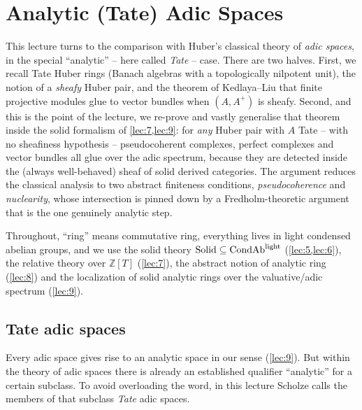 \section{Analytic (Tate) Adic Spaces}
\label{lec:10}

This lecture turns to the comparison with Huber's
classical theory of \emph{adic spaces}, in the special ``analytic'' -- here
called \emph{Tate} -- case. There are two halves. First, we recall Tate Huber
rings (Banach algebras with a topologically nilpotent unit), the notion of a
\emph{sheafy} Huber pair, and the theorem of Kedlaya--Liu that finite projective
modules glue to vector bundles when $(A,A^{+})$ is sheafy. Second, and this is
the point of the lecture, we re-prove and vastly generalise that theorem inside
the solid formalism of \cref{lec:7,lec:9}: for \emph{any} Huber pair with $A$
Tate -- with no sheafiness hypothesis -- pseudocoherent complexes, perfect
complexes and vector bundles all glue over the adic spectrum, because they are
detected inside the (always well-behaved) sheaf of solid derived categories. The
argument reduces the classical analysis to two abstract finiteness conditions,
\emph{pseudocoherence} and \emph{nuclearity}, whose intersection is pinned down
by a Fredholm-theoretic argument that is the one genuinely analytic step.

Throughout, ``ring'' means commutative ring, everything lives in light condensed
abelian groups, and we use the solid theory $\mathrm{Solid}\subseteq\mathrm{CondAb}^{\mathrm{light}}$
(\cref{lec:5,lec:6}), the relative theory over $\mathbb{Z}[T]$ (\cref{lec:7}),
the abstract notion of analytic ring (\cref{lec:8}) and the localization of
solid analytic rings over the valuative/adic spectrum (\cref{lec:9}).

\subsection{Tate adic spaces}

\begin{remark}
\label{rmk:10:terminology}
Every adic space gives rise to an analytic space in our sense (\cref{lec:9}).
But within the theory of adic spaces there is already an established qualifier
``analytic'' for a certain subclass. To avoid overloading the word, in this
lecture Scholze calls the members of that subclass \emph{Tate} adic spaces.
\end{remark}

